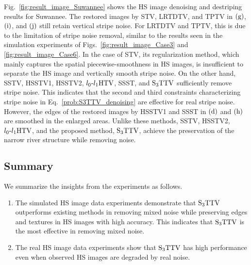 \documentclass[10pt,journal]{IEEEtran}
\begin{document}
Fig.~\ref{fig:result_image_Suwannee} shows the HS image denoising and destriping results for Suwannee.
The restored images by STV, LRTDTV, and TPTV in $\text{(g)}$, $\text{(i)}$, and $\text{(j)}$ still retain vertical stripe noise.
For LRTDTV and TPTV, this is due to the limitation of stripe noise removal, similar to the results seen in the simulation experiments of Figs.~\ref{fig:result_image_Case3} and \ref{fig:result_image_Case6}.
In the case of STV, its regularization method, which mainly captures the spatial piecewise-smoothness in HS images, is insufficient to separate the HS image and vertically smooth stripe noise.
On the other hand, SSTV, HSSTV1, HSSTV2, ${l_{0}\text{-}l_{1}\text{HTV}}$, SSST, and ${\text{S}_{3} \text{TTV}}$ sufficiently remove stripe noise.
This indicates that the second and third constraints characterizing stripe noise in Eq.~\eqref{prob:S3TTV_denoising} are effective for real stripe noise.
However, the edges of the restored images by HSSTV1 and SSST in $\text{(d)}$ and $\text{(h)}$ are smoothed in the enlarged areas.
Unlike these methods, SSTV, HSSTV2, ${l_{0}\text{-}l_{1}\text{HTV}}$, and the proposed method, ${\text{S}_{3} \text{TTV}}$, achieve the preservation of the narrow river structure while removing noise.


\subsection{Summary}
\label{subsec:Expt_summary}
We summarize the insights from the experiments as follows.
\begin{enumerate}
    \item The simulated HS image data experiments demonstrate that ${\text{S}_{3} \text{TTV}}$ outperforms existing methods in removing mixed noise while preserving edges and textures in HS images with high accuracy. 
    This indicates that ${\text{S}_{3} \text{TTV}}$ is the most effective in removing mixed noise.
    \item The real HS image data experiments show that ${\text{S}_{3} \text{TTV}}$ has high performance even when observed HS images are degraded by real noise.
\end{enumerate}


\end{document}
